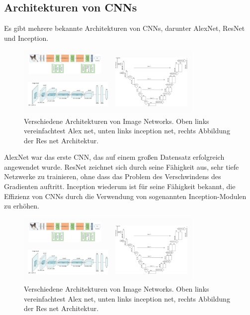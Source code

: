     \subsection{Architekturen von CNNs}
    
        Es gibt mehrere bekannte Architekturen von CNNs, darunter AlexNet, ResNet und Inception.

        \begin{figure}[h]
            \centering
            \includegraphics[width=0.8\textwidth]{img/different_types_of_cnn_nets.jpg}
            \caption{Verschiedene Architekturen von Image Networks. Oben links vereinfachtest Alex net, unten links inception net, rechts Abbildung der Res net Architektur.}
            \label{fig:my_label}
        \end{figure}
        
        AlexNet war das erste CNN, das auf einem großen Datensatz erfolgreich angewendet wurde.
        ResNet zeichnet sich durch seine Fähigkeit aus, sehr tiefe Netzwerke zu trainieren, ohne dass das Problem des Verschwindens des Gradienten auftritt.  
        Inception wiederum ist für seine Fähigkeit bekannt, die Effizienz von CNNs durch die Verwendung von sogenannten Inception-Modulen zu erhöhen.

        \begin{figure}[h]
            \centering
            \includegraphics[width=0.8\textwidth]{img/different_types_of_cnn_nets.jpg}
            \caption{Verschiedene Architekturen von Image Networks. Oben links vereinfachtest Alex net, unten links inception net, rechts Abbildung der Res net Architektur.}
            \label{fig:my_label}
        \end{figure}
        
